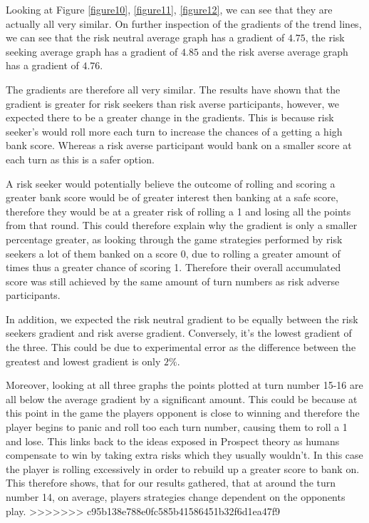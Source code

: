 \documentclass[a4paper,titlepage]{article}
\begin{document}
Looking at Figure \ref{figure10}, \ref{figure11}, \ref{figure12}, we can see that they are actually all very similar. On further inspection of the gradients of the trend lines, we can see that the risk neutral average graph has a gradient of $4.75$, the risk seeking average graph has a gradient of $4.85$ and the risk averse average graph has a gradient of $4.76$.

The gradients are therefore all very similar. The results have shown that the gradient is greater for risk seekers than risk averse participants, however, we expected there to be a greater change in the gradients. This is because risk seeker’s would roll more each turn to increase the chances of a getting a high bank score. Whereas a risk averse participant would bank on a smaller score at each turn as this is a safer option.

A risk seeker would potentially believe the outcome of rolling and scoring a greater bank score would be of greater interest then banking at a safe score, therefore they would be at a greater risk of rolling a 1 and losing all the points from that round. This could therefore explain why the gradient is only a smaller percentage greater, as looking through the game strategies performed by risk seekers a lot of them banked on a score 0, due to rolling a greater amount of times thus a greater chance of scoring 1. Therefore their overall accumulated score was still achieved by the same amount of turn numbers as risk adverse participants.

In addition, we expected the risk neutral gradient to be equally between the risk seekers gradient and risk averse gradient. Conversely, it’s the lowest gradient of the three. This could be due to experimental error as the difference between the greatest and lowest gradient is only $2\%$.

Moreover, looking at all three graphs the points plotted at turn number 15-16 are all below the average gradient by a significant amount. This could be because at this point in the game the players opponent is close to winning and therefore the player begins to panic and roll too each turn number, causing them to roll a 1 and lose. This links back to the ideas exposed in Prospect theory\cite{kahneman2013prospect} as humans compensate to win by taking extra risks which they usually wouldn’t. In this case the player is rolling excessively in order to rebuild up a greater score to bank on. This therefore shows, that for our results gathered, that at around the turn number 14, on average, players strategies change dependent on the opponents play.
>>>>>>> c95b138e788e0fc585b41586451b32f6d1ea47f9
\end{document}
